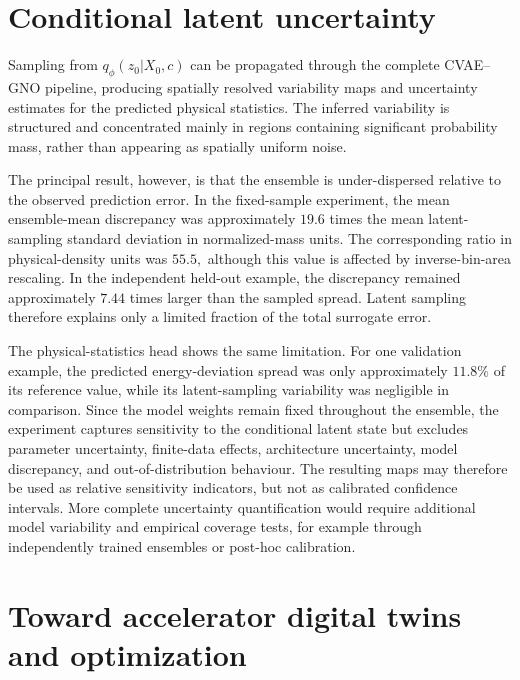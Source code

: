 \section{Conditional latent uncertainty}
\label{sec:06_discussion_and_perspectives_conditional_latent_uncertainty}

Sampling from \(q_{\phi} ( z_{0} | X_{0} , c )\) can be propagated through the complete CVAE–GNO pipeline, producing spatially resolved variability maps and uncertainty estimates for the predicted physical statistics. The inferred variability is structured and concentrated mainly in regions containing significant probability mass, rather than appearing as spatially uniform noise.

The principal result, however, is that the ensemble is under-dispersed relative to the observed prediction error. In the fixed-sample experiment, the mean ensemble-mean discrepancy was approximately \(19.6\) times the mean latent-sampling standard deviation in normalized-mass units. The corresponding ratio in physical-density units was \(55.5 ,\) although this value is affected by inverse-bin-area rescaling. In the independent held-out example, the discrepancy remained approximately \(7.44\) times larger than the sampled spread. Latent sampling therefore explains only a limited fraction of the total surrogate error.

The physical-statistics head shows the same limitation. For one validation example, the predicted energy-deviation spread was only approximately \(11.8 \%\) of its reference value, while its latent-sampling variability was negligible in comparison. Since the model weights remain fixed throughout the ensemble, the experiment captures sensitivity to the conditional latent state but excludes parameter uncertainty, finite-data effects, architecture uncertainty, model discrepancy, and out-of-distribution behaviour. The resulting maps may therefore be used as relative sensitivity indicators, but not as calibrated confidence intervals. More complete uncertainty quantification would require additional model variability and empirical coverage tests, for example through independently trained ensembles or post-hoc calibration.

\section{Toward accelerator digital twins and optimization}
\label{sec:06_discussion_and_perspectives_toward_accelerator_digital_twins_and_optimization}

